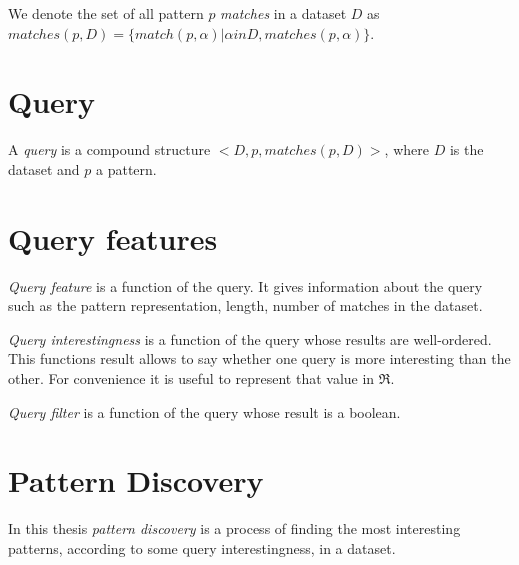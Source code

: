 We denote the set of all pattern $p$ \emph{matches} in a dataset 
$D$ as $matches(p, D) = \{ match(p, \alpha) | \alpha in D, matches(p, \alpha) \}$.

\section{Query}

A \emph{query} is a compound structure $<D, p, matches(p, D)>$, 
where $D$ is the dataset and $p$ a pattern.

\section{Query features}

\emph{Query feature} is a function of the query. It gives 
information about the query such as the pattern representation, 
length, number of matches in the dataset.

\emph{Query interestingness} is a function of the query whose
results are well-ordered. This functions result allows to
say whether one query is more interesting than the other.
For convenience it is useful to represent that value in
$\Re$.

\emph{Query filter} is a function of the query whose result
is a boolean.

\section{Pattern Discovery}

In this thesis \emph{pattern discovery} is a process of finding 
the most interesting patterns, according to some query interestingness,
in a dataset.
